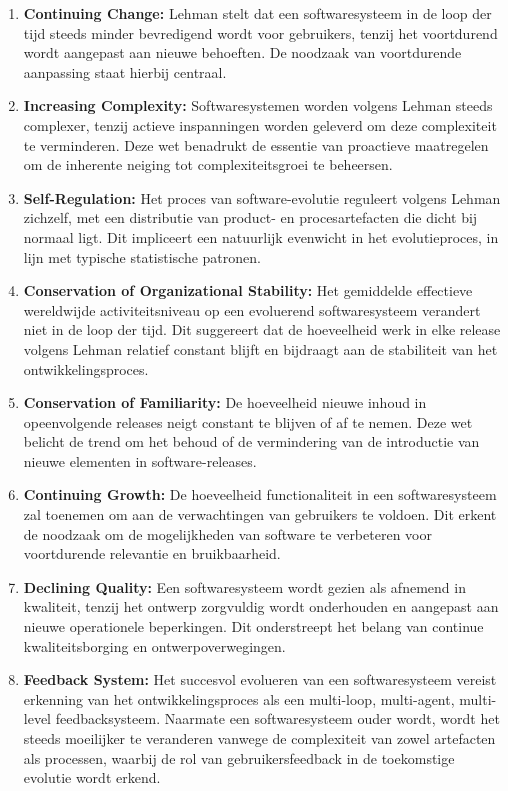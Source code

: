 \begin{enumerate}
	\item \textbf{Continuing Change:} Lehman stelt dat een softwaresysteem in de loop der tijd steeds minder bevredigend wordt voor gebruikers, tenzij het voortdurend wordt aangepast aan nieuwe behoeften. De noodzaak van voortdurende aanpassing staat hierbij centraal.
	
	\item \textbf{Increasing Complexity:} Softwaresystemen worden volgens Lehman steeds complexer, tenzij actieve inspanningen worden geleverd om deze complexiteit te verminderen. Deze wet benadrukt de essentie van proactieve maatregelen om de inherente neiging tot complexiteitsgroei te beheersen.
	
	\item \textbf{Self-Regulation:} Het proces van software-evolutie reguleert volgens Lehman zichzelf, met een distributie van product- en procesartefacten die dicht bij normaal ligt. Dit impliceert een natuurlijk evenwicht in het evolutieproces, in lijn met typische statistische patronen.
	
	\item \textbf{Conservation of Organizational Stability:} Het gemiddelde effectieve wereldwijde activiteitsniveau op een evoluerend softwaresysteem verandert niet in de loop der tijd. Dit suggereert dat de hoeveelheid werk in elke release volgens Lehman relatief constant blijft en bijdraagt aan de stabiliteit van het ontwikkelingsproces.
	
	\item \textbf{Conservation of Familiarity:} De hoeveelheid nieuwe inhoud in opeenvolgende releases neigt constant te blijven of af te nemen. Deze wet belicht de trend om het behoud of de vermindering van de introductie van nieuwe elementen in software-releases.
	
	\item \textbf{Continuing Growth:} De hoeveelheid functionaliteit in een softwaresysteem zal toenemen om aan de verwachtingen van gebruikers te voldoen. Dit erkent de noodzaak om de mogelijkheden van software te verbeteren voor voortdurende relevantie en bruikbaarheid.
	
	\item \textbf{Declining Quality:} Een softwaresysteem wordt gezien als afnemend in kwaliteit, tenzij het ontwerp zorgvuldig wordt onderhouden en aangepast aan nieuwe operationele beperkingen. Dit onderstreept het belang van continue kwaliteitsborging en ontwerpoverwegingen.
	
	\item \textbf{Feedback System:} Het succesvol evolueren van een softwaresysteem vereist erkenning van het ontwikkelingsproces als een multi-loop, multi-agent, multi-level feedbacksysteem. Naarmate een softwaresysteem ouder wordt, wordt het steeds moeilijker te veranderen vanwege de complexiteit van zowel artefacten als processen, waarbij de rol van gebruikersfeedback in de toekomstige evolutie wordt erkend. \autocite{Godfrey2013}
\end{enumerate}

